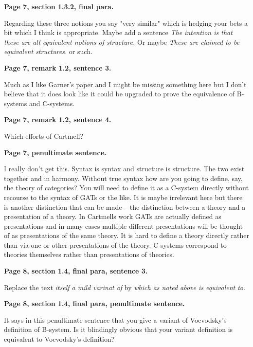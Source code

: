 \documentclass[10pt,a4paper]{scrartcl}
\newenvironment{comment}[1]
{\begin{framed}
\textbf{#1}
}
{
\end{framed}
}
\begin{document}
\begin{comment}{Page 7, section 1.3.2, final para.}
Regarding these three notions you say "very similar"  which is hedging your bets a bit which I think is appropriate. Maybe add a sentence \textit{The intention is that these are all equivalent notions of structure.} 
Or maybe \textit{These are claimed to be equivalent structures.} or
such.
\end{comment} 

\begin{comment}{Page 7, remark 1.2, sentence 3.}
Much as I like Garner's paper and I might be missing something here but I don't believe that it does look like it could be upgraded to prove the equivalence of B-systems and C-systems.
\end{comment} 

\begin{comment}{Page 7, remark 1.2, sentence 4.}
Which efforts of Cartmell?
\end{comment} 

\begin{comment}{Page 7, penultimate sentence.}
I really don't get this. Syntax is syntax and structure is structure.  The two exist together and in harmony. Without true syntax how are you going to define, say, the theory of categories?  You will need to define it as a  C-system  directly without recourse to the syntax of GATs or the like.   It is maybe irrelevant here but there is another distinction that can be made  -- the distinction between a theory and a presentation of a theory.   In Cartmells work GATs are actually defined as presentations and in many cases multiple different presentations will be thought of as presentations of the same theory. It is hard to define a theory directly rather than via one or other presentations of the theory. C-systems correspond to theories themselves  rather than presentations of theories.
\end{comment} 

\begin{comment}{Page 8, section 1.4, final para, sentence 3.}
Replace the text \textit{itself a mild varinat of} by 
\textit{which as noted above is equivalent to}. 
\end{comment} 

\begin{comment}{Page 8, section 1.4, final para, penultimate sentence.}
It says in this penultimate sentence that you give a variant of Voevodsky's definition of B-system. Is it blindingly obvious that your variant definition is equivalent to Voevodsky's definition?
\end{comment} 
\end{document}
